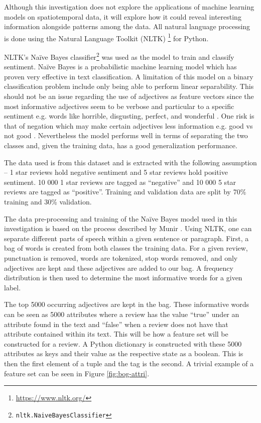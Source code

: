 Although this investigation does not explore the applications of machine learning models on spatiotemporal data, it will explore how it could reveal interesting information alongside patterns among the data. All natural language processing is done using the Natural Language Toolkit (NLTK)
\footnote{\url{https://www.nltk.org/}} for Python.

NLTK's Na\"ive Bayes classifier\footnote{\texttt{nltk.NaiveBayesClassifier}} was used as the model to train and classify sentiment. Na\"ive Bayes is a probabilistic machine learning model which has proven very effective in text classification. A limitation of this model on a binary classification
problem include only being able to perform linear separability. This should not be an issue regarding the use of adjectives as feature vectors since the most informative adjectives seem to be verbose and particular to a specific sentiment e.g. words like horrible, disgusting, perfect, and
wonderful \cite{rish2001empirical}. One risk is that of negation which may make certain adjectives less information e.g. good vs not good \cite{blanco2011some}. Nevertheless the model performs well in terms of separating the two classes and, given the training data, has a good generalization
performance.

The data used is from this dataset and is extracted with the following assumption -- 1 star reviews hold negative sentiment and 5 star reviews hold positive sentiment. 10 000 1 star reviews are tagged as ``negative'' and 10 000 5 star reviews are tagged as ``positive''. Training and validation data are split by 70\% training and 30\% validation.

The data pre-processing and training of the Na\"ive Bayes model used in this investigation is based on the process described by Munir \cite{SamiraMunir}. Using NLTK, one can separate different parts of speech within a given sentence or paragraph. First, a bag of words is created from both classes
the training data. For a given review, punctuation is removed, words are tokenized, stop words removed, and only adjectives are kept and these adjectives are added to our bag. A frequency distribution is then used to determine the most informative words for a given label.

The top 5000 occurring adjectives are kept in the bag. These informative words can be seen as 5000 attributes where a review has the value ``true'' under an attribute found in the text and ``false'' when a review does not have that attribute contained within its text. This will be how a feature set will be constructed for a review. A Python dictionary is constructed with these 5000 attributes as keys and their value as the respective state as a boolean. This is then the first element of a tuple and the tag is the second. A trivial example of a feature set can be seen in Figure \ref{fig:bog-attri}.

